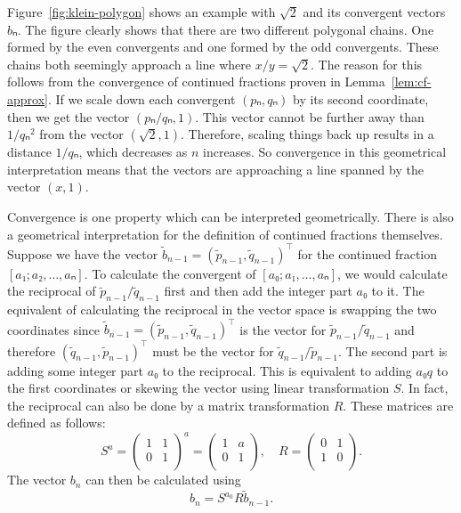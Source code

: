 Figure~\ref{fig:klein-polygon} shows an example with $\sqrt{2}$ and its convergent vectors $bₙ$.
The figure clearly shows that there are two different polygonal chains.
One formed by the even convergents and one formed by the odd convergents.
These chains both seemingly approach a line where $x/y = \sqrt{2}$.
The reason for this follows from the convergence of continued fractions proven in Lemma~\ref{lem:cf-approx}.
If we scale down each convergent $(pₙ, qₙ)$ by its second coordinate,
then we get the vector $(pₙ/qₙ, 1)$.
This vector cannot be further away than $1/qₙ^2$ from the vector $(\sqrt{2}, 1)$.
Therefore, scaling things back up results in a distance $1/qₙ$, which decreases as $n$ increases.
So convergence in this geometrical interpretation means that the vectors are
approaching a line spanned by the vector $(x, 1)$.

Convergence is one property which can be interpreted geometrically.
There is also a geometrical interpretation for the definition of continued fractions themselves.
Suppose we have the vector $\tilde b_{n-1} = (\tilde p_{n-1}, \tilde q_{n-1})^⊤$
for the continued fraction $[a₁; a₂, …, aₙ]$.
To calculate the convergent of $[a₀; a₁, …, aₙ]$,
we would calculate the reciprocal of $\tilde p_{n-1} / \tilde q_{n-1}$ first
and then add the integer part $a₀$ to it.
The equivalent of calculating the reciprocal in the vector space is swapping the two coordinates
since $\tilde b_{n-1} = (\tilde p_{n-1}, \tilde q_{n-1})^⊤$ is the vector for $\tilde p_{n-1} / \tilde q_{n-1}$
and therefore $(\tilde q_{n-1}, \tilde p_{n-1})^⊤$ must be the vector for $\tilde q_{n-1} / \tilde p_{n-1}$.
The second part is adding some integer part $a₀$ to the reciprocal.
This is equivalent to adding $a₀ q$ to the first coordinates
or skewing the vector using linear transformation $S$.
In fact, the reciprocal can also be done by a matrix transformation $R$.
These matrices are defined as follows:
\[
  S^a =
  \begin{pmatrix}
    1 & 1 \\
    0 & 1 \\
  \end{pmatrix}^a
  =
  \begin{pmatrix}
    1 & a \\
    0 & 1 \\
  \end{pmatrix},
  \quad
  R =
  \begin{pmatrix}
    0 & 1 \\
    1 & 0 \\
  \end{pmatrix}.
\]
The vector $b_n$ can then be calculated using
\[
  b_n = S^{a_0} R \tilde b_{n-1}.
\]

